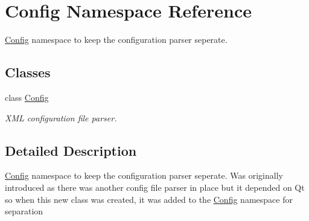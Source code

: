 \hypertarget{namespaceConfig}{
\section{Config Namespace Reference}
\label{namespaceConfig}
}


\hyperlink{namespaceConfig}{Config} namespace to keep the configuration parser seperate.  


\subsection*{Classes}
\begin{DoxyCompactItemize}
\item 
class \hyperlink{classConfig_1_1Config}{Config}
\begin{DoxyCompactList}\small\item\em XML configuration file parser. \item\end{DoxyCompactList}\end{DoxyCompactItemize}


\subsection{Detailed Description}
\hyperlink{namespaceConfig}{Config} namespace to keep the configuration parser seperate. Was originally introduced as there was another config file parser in place but it depended on Qt so when this new class was created, it was added to the \hyperlink{namespaceConfig}{Config} namespace for separation 